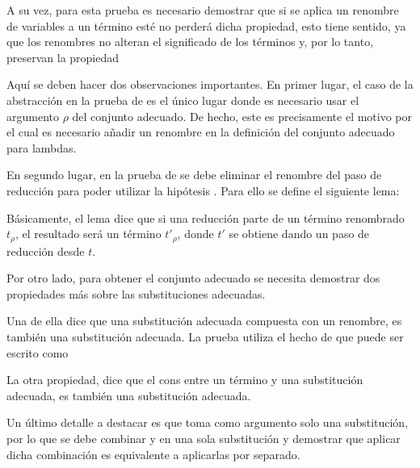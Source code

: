 
A su vez, para esta prueba es necesario demostrar que si se aplica un renombre de variables a un término \snstar esté no perderá dicha propiedad, esto tiene sentido, ya que los renombres no alteran el significado de los términos y, por lo tanto, preservan la propiedad \snstar


Aquí se deben hacer dos observaciones importantes.
En primer lugar, el caso de la abstracción en la prueba de  es el único lugar donde es necesario usar el argumento $\rho$ del conjunto adecuado.
De hecho, este es precisamente el motivo por el cual es necesario añadir un renombre en la definición del conjunto adecuado para lambdas.

En segundo lugar, en la prueba de  se debe eliminar el renombre del paso de reducción para poder utilizar la hipótesis .
Para ello se define el siguiente lema:


Básicamente, el lema dice que si una reducción parte de un término renombrado $t_\rho$, el resultado será un término $t'_\rho$, donde $t'$ se obtiene dando un paso de reducción desde $t$.


Por otro lado, para obtener el conjunto adecuado
se necesita demostrar dos propiedades más sobre las substituciones adecuadas.

Una de ella dice que una substitución adecuada compuesta con un renombre, es también una substitución adecuada.
La prueba utiliza el hecho de que   puede ser escrito como
\subst{\comp{\ids}{\bound{$\rho$}}}{}


La otra propiedad, dice que el cons entre un término \snstar y una substitución adecuada, es también una substitución adecuada.


Un último detalle a destacar es que  toma como argumento solo una substitución, por lo que se debe combinar \bound{$\sigma$} y
en una sola substitución y demostrar que aplicar dicha combinación es equivalente a aplicarlas por separado.

